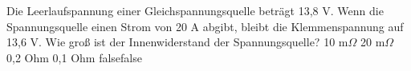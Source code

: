     {Die Leerlaufspannung einer Gleichspannungsquelle beträgt 13,8 V. Wenn die Spannungsquelle einen Strom von 20 A abgibt, bleibt die Klemmenspannung auf 13,6 V. Wie groß ist der Innenwiderstand der Spannungsquelle?}
    {10 m$\Omega$}
    {20 m$\Omega$}
    {0,2 Ohm}
    {0,1 Ohm}
    {false}{false}